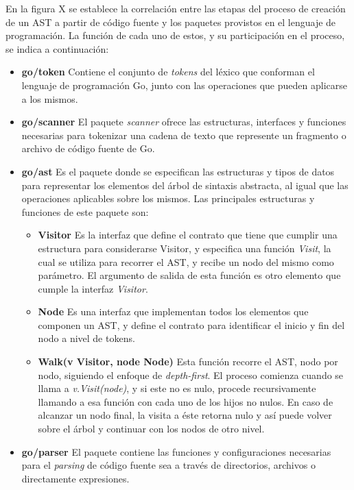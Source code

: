 En la figura X se establece la correlación entre las etapas del proceso de creación de un AST 
a partir de código fuente y los paquetes provistos en el lenguaje de programación.
La función de cada uno de estos, y su participación en el proceso, se indica a continuación:
\begin{itemize}
  \item \textbf{go/token} Contiene el conjunto de \textit{tokens} del léxico que conforman el 
  lenguaje de programación Go, junto con las operaciones que pueden aplicarse a los mismos.
  \item \textbf{go/scanner} El paquete \textit{scanner} ofrece las estructuras, interfaces y 
  funciones necesarias para tokenizar una cadena de texto que represente un fragmento o 
  archivo de código fuente de Go.
  \item \textbf{go/ast} Es el paquete donde se especifican las estructuras y tipos de datos para 
  representar los elementos del árbol de sintaxis abstracta, al igual que las operaciones aplicables 
  sobre los mismos.
  Las principales estructuras y funciones de este paquete son:
  \begin{itemize}
    \item \textbf{Visitor} Es la interfaz que define el contrato que tiene que cumplir una estructura 
    para considerarse Visitor, y especifica una función \textit{Visit}, la cual se utiliza para 
    recorrer el AST, y recibe un nodo del mismo como parámetro.
    El argumento de salida de esta función es otro elemento que cumple la interfaz \textit{Visitor}.
    \item \textbf{Node} Es una interfaz que implementan todos los elementos que componen un AST, y 
    define el contrato para identificar el inicio y fin del nodo a nivel de tokens.
    \item \textbf{Walk(v Visitor, node Node)} Esta función recorre el AST, nodo por nodo, siguiendo 
    el enfoque de \textit{depth-first}.
    El proceso comienza cuando se llama a \textit{v.Visit(node)}, y si este no es nulo, procede 
    recursivamente llamando a esa función con cada uno de los hijos no nulos.
    En caso de alcanzar un nodo final, la visita a éste retorna nulo y así puede volver sobre el árbol 
    y continuar con los nodos de otro nivel.
  \end{itemize}
  \item \textbf{go/parser} El paquete contiene las funciones y configuraciones necesarias para el \textit{parsing} 
  de código fuente sea a través de directorios, archivos o directamente expresiones. 

\end{itemize}
